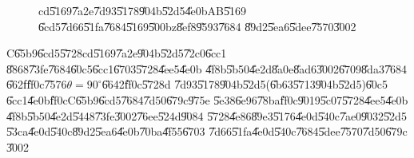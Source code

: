 \documentclass[12pt,a4paper]{article}
\begin{document}
\begin{figure}[th]
\caption{cd\U{5169}\U{7a2e}\U{7d93}\U{5178}\U{904b}\U{52d5}\U{4e0b}AB\U{5169}%
\U{6cd5}\U{7d66}\U{51fa}\U{7684}\U{5169}\U{500b}z\U{8ef8}\U{9593}\U{7684}%
\U{89d2}\U{5ea6}\U{5dee}\U{7570}\U{3002}}
\begin{center}
\frame{}
\end{center}
\end{figure}

C\U{65b9}\U{6cd5}\U{5728}cd\U{5169}\U{7a2e}\U{904b}\U{52d5}\U{72c0}\U{6cc1}%
\U{8868}\U{73fe}\U{7684}\U{60c5}\U{6cc1}\U{6703}\U{5728}\U{4ee5}\U{4e0b}%
\U{4f8b}\U{5b50}\U{4e2d}\U{8a0e}\U{8ad6}\U{3002}\U{6709}\U{8da3}\U{7684}%
\U{662f}\U{ff0c}\U{7576}$\theta =90^{\circ }$\U{6642}\U{ff0c}\U{5728}d%
\U{7d93}\U{5178}\U{904b}\U{52d5}(\U{6b63}\U{5713}\U{904b}\U{52d5})\U{60c5}%
\U{6cc1}\U{4e0b}\U{ff0c}C\U{65b9}\U{6cd5}\U{7684}\U{7d50}\U{679c}\U{975e}%
\U{5e38}\U{6e96}\U{78ba}\U{ff0c}\U{9019}\U{5c07}\U{5728}\U{4ee5}\U{4e0b}%
\U{4f8b}\U{5b50}\U{4e2d}\U{5448}\U{73fe}\U{3002}\U{76ee}\U{524d}\U{9084}%
\U{5728}\U{4e86}\U{89e3}\U{5176}\U{4e0d}\U{540c}\U{7ae0}\U{9032}\U{52d5}%
\U{53ca}\U{4e0d}\U{540c}\U{89d2}\U{5ea6}\U{4e0b}\U{70ba}\U{4f55}\U{6703}%
\U{7d66}\U{51fa}\U{4e0d}\U{540c}\U{7684}\U{5dee}\U{7570}\U{7d50}\U{679c}%
\U{3002}

\clearpage%
\end{document}
